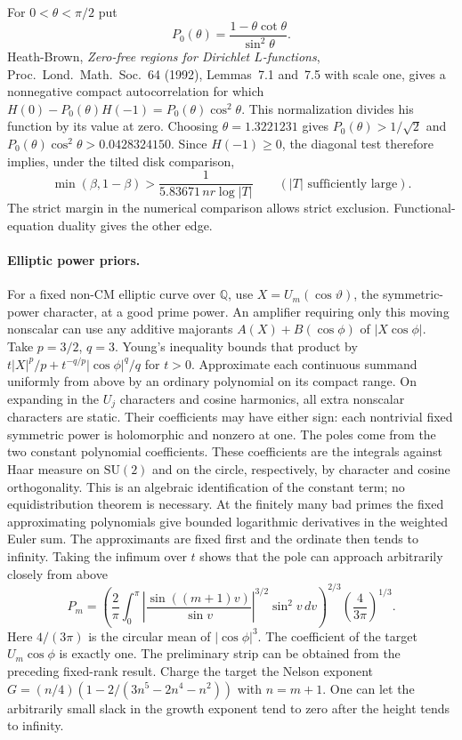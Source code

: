 For $0<\theta<\pi/2$ put
\[
 P_0(\theta)=\frac{1-\theta\cot\theta}{\sin^2\theta}.
\]
Heath-Brown, \emph{Zero-free regions for Dirichlet $L$-functions},
Proc.~Lond.~Math.~Soc.~64 (1992), Lemmas~7.1 and~7.5 with scale one,
gives a nonnegative compact autocorrelation for which
$H(0)-P_0(\theta)H(-1)=P_0(\theta)\cos^2\theta$. This normalization
divides his function by its value at zero. Choosing
$\theta=1.3221231$ gives $P_0(\theta)>1/\sqrt2$ and
$P_0(\theta)\cos^2\theta>0.0428324150$.
Since $H(-1)\ge0$, the diagonal test therefore implies, under the
tilted disk comparison,
\[
        \min(\beta,1-\beta)>
          \frac1{5.83671\,nr\log|T|}
        \qquad(|T|\text{ sufficiently large}).
\]
The strict margin in the numerical comparison allows strict exclusion.
Functional-equation duality gives the other edge.

\paragraph{Elliptic power priors.}
For a fixed non-CM elliptic curve over $\mathbb Q$, use
$X=U_m(\cos\vartheta)$, the symmetric-power character, at a good
prime power. An amplifier requiring only this moving nonscalar can
use any additive majorants $A(X)+B(\cos\phi)$ of $|X\cos\phi|$.
Take $p=3/2$, $q=3$. Young's inequality bounds that product by
$t|X|^p/p+t^{-q/p}|\cos\phi|^q/q$ for $t>0$. Approximate each
continuous summand uniformly from above by an ordinary polynomial
on its compact range. On expanding in the $U_j$ characters and cosine
harmonics, all extra nonscalar characters are static. Their coefficients
may have either sign: each nontrivial fixed symmetric power is
holomorphic and nonzero at one. The poles come from the two constant
polynomial coefficients. These coefficients are the integrals against
Haar measure on $\mathrm{SU}(2)$ and on the circle, respectively,
by character and cosine orthogonality. This is an algebraic identification
of the constant term; no equidistribution theorem is necessary.
At the finitely many bad primes the fixed approximating polynomials
give bounded logarithmic derivatives in the weighted Euler sum.
The approximants are fixed first and the ordinate then tends to
infinity. Taking the infimum over $t$ shows that the pole can approach
arbitrarily closely from above
\[
 P_m=\left(\frac2\pi\int_0^\pi
    \left|\frac{\sin((m+1)v)}{\sin v}\right|^{3/2}
        \sin^2 v\,dv\right)^{2/3}
       \left(\frac4{3\pi}\right)^{1/3} .
\]
Here $4/(3\pi)$ is the circular mean of $|\cos\phi|^3$.
The coefficient of the target $U_m\cos\phi$ is exactly one. The
preliminary strip can be obtained from the preceding fixed-rank result.
Charge the target the Nelson exponent
$G=(n/4)(1-2/(3n^5-2n^4-n^2))$ with $n=m+1$.
One can let the arbitrarily small slack in the growth exponent tend
to zero after the height tends to infinity.

